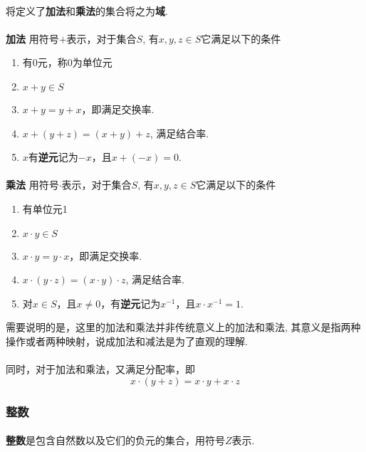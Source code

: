 \paragraph{}
将定义了\textbf{加法}和\textbf{乘法}的集合将之为\textbf{域}. 

\paragraph{}
\textbf{加法} \: 用符号$+$表示，对于集合$S$, 有$x, y, z \in S$它满足以下的条件
\begin{enumerate}[itemindent=2em]
\item 有0元，称0为单位元
\item $x + y \in S$
\item  $x + y = y + x$，即满足交换率.
\item $x + (y + z) = (x + y) + z$, 满足结合率.
\item $x$有\textbf{逆元}记为$-x$，且$x + (-x) = 0$.
\end{enumerate}

\paragraph{}
\textbf{乘法} \: 用符号$\cdot$表示，对于集合$S$, 有$x, y, z \in S$它满足以下的条件
\begin{enumerate}[itemindent=2em]
\item 有单位元1
\item $x \cdot y \in S$
\item  $x \cdot y = y \cdot x$，即满足交换率.
\item $x \cdot (y \cdot z) = (x \cdot y) \cdot z$, 满足结合率.
\item 对$x \in S$，且$x \neq 0$，有\textbf{逆元}记为$x^{-1}$，且$x \cdot x^{-1} = 1$.
\end{enumerate}
需要说明的是，这里的加法和乘法并非传统意义上的加法和乘法, 其意义是指两种操作或者两种映射，说成加法和减法是为了直观的理解. 

\paragraph{}
同时，对于加法和乘法，又满足分配率，即
$$
x \cdot (y + z) = x \cdot y + x \cdot z
$$

\subsubsection{整数}
\paragraph{}
\textbf{整数}是包含自然数以及它们的负元的集合，用符号$Z$表示. 

